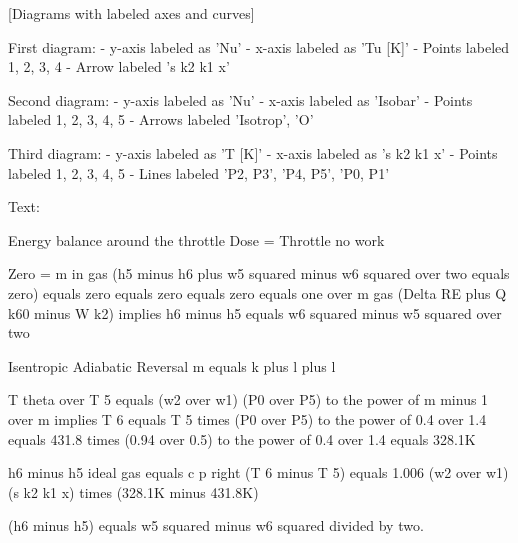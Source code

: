 [Diagrams with labeled axes and curves]

First diagram:
- y-axis labeled as 'Nu'
- x-axis labeled as 'Tu [K]'
- Points labeled 1, 2, 3, 4
- Arrow labeled 's k2 k1 x'

Second diagram:
- y-axis labeled as 'Nu'
- x-axis labeled as 'Isobar'
- Points labeled 1, 2, 3, 4, 5
- Arrows labeled 'Isotrop', 'O'

Third diagram:
- y-axis labeled as 'T [K]'
- x-axis labeled as 's k2 k1 x'
- Points labeled 1, 2, 3, 4, 5
- Lines labeled 'P2, P3', 'P4, P5', 'P0, P1'

Text:

Energy balance around the throttle
Dose = Throttle no work

Zero = m in gas (h5 minus h6 plus w5 squared minus w6 squared over two equals zero) equals zero equals zero equals zero equals one over m gas (Delta RE plus Q k60 minus W k2) implies h6 minus h5 equals w6 squared minus w5 squared over two

Isentropic Adiabatic Reversal
m equals k plus l plus l

T theta over T 5 equals (w2 over w1) (P0 over P5) to the power of m minus 1 over m implies T 6 equals T 5 times (P0 over P5) to the power of 0.4 over 1.4 equals 431.8 times (0.94 over 0.5) to the power of 0.4 over 1.4 equals 328.1K

h6 minus h5 ideal gas equals c p right (T 6 minus T 5) equals 1.006 (w2 over w1) (s k2 k1 x) times (328.1K minus 431.8K)

(h6 minus h5) equals w5 squared minus w6 squared divided by two.